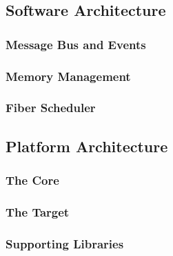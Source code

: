 \subsection{Software Architecture}

\subsubsection{Message Bus and Events}
\subsubsection{Memory Management}
\subsubsection{Fiber Scheduler}

\subsection{Platform Architecture}

\subsubsection{The Core}
\subsubsection{The Target}
\subsubsection{Supporting Libraries}

